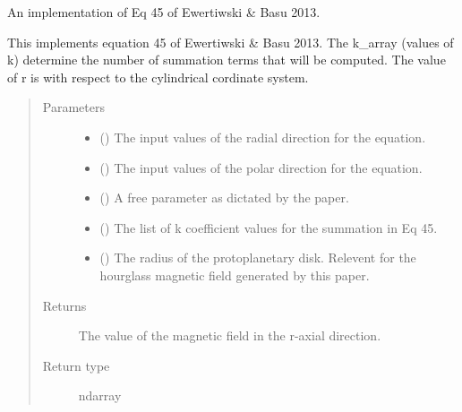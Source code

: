 \documentclass[letterpaper,10pt,english]{sphinxmanual}
\begin{document}
\begin{fulllineitems}
\label{\detokenize{Backend.Ewertowski_Basu_2013:Backend.Ewertowski_Basu_2013.Ewer_Basu__B_r}}
An implementation of Eq 45 of Ewertiwski \& Basu 2013.

This implements equation 45 of Ewertiwski \& Basu 2013. The k\_array (values
of k) determine the number of summation terms that will be computed. The
value of r is with respect to the cylindrical cordinate system.
\begin{quote}\begin{description}
\item[{Parameters}] \leavevmode\begin{itemize}
\item {} 
 () \textendash{} The input values of the radial direction for the equation.

\item {} 
 () \textendash{} The input values of the polar direction for the equation.

\item {} 
 () \textendash{} A free parameter as dictated by the paper.

\item {} 
 () \textendash{} The list of k coefficient values for the summation in Eq 45.

\item {} 
 () \textendash{} The radius of the protoplanetary disk. Relevent for the hourglass
magnetic field generated by this paper.

\end{itemize}

\item[{Returns}] \leavevmode
{} \textendash{} The value of the magnetic field in the r-axial direction.

\item[{Return type}] \leavevmode
ndarray

\end{description}\end{quote}

\end{fulllineitems}
\end{document}
